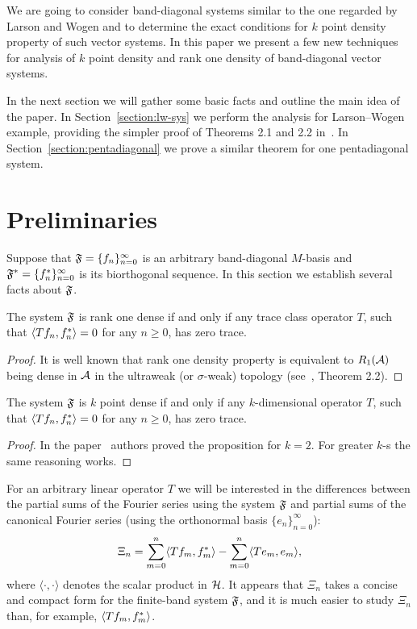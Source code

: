 \documentclass[12pt]{amsart}
\theoremstyle{case}
\begin{document}
    We are going to consider band-diagonal systems similar to the one regarded by Larson and Wogen and to determine the exact conditions
      for $k$ point density property of such vector systems.
    In this paper we present a few new techniques for analysis of $k$ point density and rank one density of band-diagonal vector systems.

    In the next section we will gather some basic facts and outline the main idea of the paper.
    In Section~\ref{section:lw-sys} we perform the analysis for Larson--Wogen example, providing the simpler proof of Theorems 2.1 and 2.2 in~\cite{katavolos}.
    In Section~\ref{section:pentadiagonal} we prove a similar theorem for one pentadiagonal system.
\section{Preliminaries}
  \label{sec:preliminaries}
  Suppose that $\fsys=\{f_n\}_{n=0}^\infty$ is an arbitrary band-diagonal $M$-basis and $\fstarsys = \{f^*_n\}_{n=0}^\infty$ is its biorthogonal sequence.
  In this section we establish several facts about $\fsys$.
  \begin{prop}
    The system $\fsys$ is rank one dense if and only if any trace class operator $T$,
      such that $\inner{Tf_n}{f_n^*} = 0$ for any $n \geq 0$, has  zero trace.
  \end{prop}
  \begin{proof}
    It is well known that rank one density property is equivalent to $R_1(\cal{A})$ being dense
      in $\cal{A}$ in the ultraweak (or $\sigma$-weak) topology (see~\cite{katavolos}, Theorem 2.2).
  \end{proof}
  \begin{prop}
    The system $\fsys$ is $k$ point dense if and only if any $k$-dimensional operator $T$,
      such that $\inner{Tf_n}{f_n^*} = 0$ for any $n \geq 0$, has  zero trace.
  \end{prop}
  \begin{proof}
    In the paper~\cite{katavolos} authors proved the proposition for $k = 2$.
    For greater $k$-s the same reasoning works.
  \end{proof}
  For an arbitrary linear operator $T$ we will be interested in the differences between
    the partial sums of the Fourier series using the system $\fsys$ and
    partial sums of the canonical Fourier series (using the orthonormal basis $\{e_n\}_{n=0}^\infty$):
  \begin{equation}
    \label{eq:xi}
    \Xi_n = \sum_{m=0}^n \inner{Tf_m}{f_m^*} - \sum_{m=0}^n \inner{Te_m}{e_m},
  \end{equation}
    where $\langle \cdot, \cdot\rangle$ denotes the scalar product in $\cal{H}$.
  It appears that $\Xi_n$ takes a concise and compact form for the finite-band system $\fsys$, and it is much easier to study $\Xi_n$
    than, for example, $\inner{Tf_m}{f_m^*}$.
\end{document}

